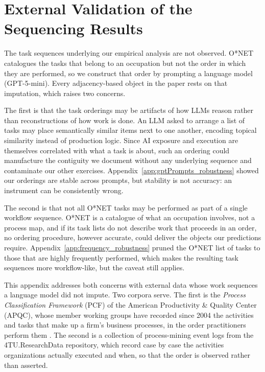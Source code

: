 \section{External Validation of the Sequencing Results}
\label{app:external_validation}

The task sequences underlying our empirical analysis are not observed.
O*NET catalogues the tasks that belong to an occupation but not the order in which they are performed, so we
construct that order by prompting a language model (GPT-5-mini).
Every adjacency-based object in the paper rests on that imputation, which raises two concerns.

The first is that the task orderings may be artifacts of how LLMs reason rather than reconstructions of
how work is done.
An LLM asked to arrange a list of tasks may place semantically similar items next to one another, encoding
topical similarity instead of production logic.
Since AI exposure and execution are themselves correlated with what a task is about, such an ordering could manufacture the
contiguity we document without any underlying sequence and contaminate our other exercises.
Appendix~\ref{app:gptPrompts_robustness} showed our orderings are stable across prompts, but stability is
not accuracy: an instrument can be consistently wrong.

The second is that not all O*NET tasks may be performed as part of a single workflow sequence.
O*NET is a catalogue of what an occupation involves, not a process map, and if its task lists do not describe
work that proceeds in an order, no ordering procedure, however accurate, could deliver the objects our predictions require.
Appendix~\ref{app:frequency_robustness} pruned the O*NET list of tasks to those that are highly frequently performed, which makes
the resulting task sequences more workflow-like, but the caveat still applies.

This appendix addresses both concerns with external data whose work sequences a language model did not impute.
Two corpora serve.
The first is the \emph{Process Classification Framework} (PCF) of the American Productivity \& Quality Center
(APQC), whose member working groups have recorded since 2004 the activities and tasks that make up a firm's
business processes, in the order practitioners perform them \citep{apqc_pcf}.
The second is a collection of process-mining event logs from the 4TU.ResearchData repository, which record
case by case the activities organizations actually executed and when, so that the order is observed rather
than asserted.

